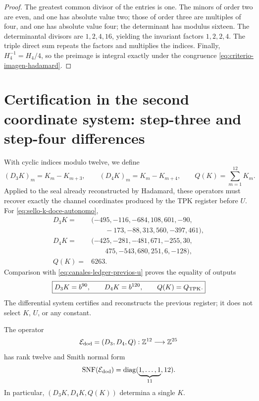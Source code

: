 \begin{proof}
The greatest common divisor of the entries is one. The minors of order two are
even, and one has absolute value two; those of order three are multiples of
four, and one has absolute value four; the determinant has modulus
sixteen. The determinantal divisors are \(1,2,4,16\), yielding
the invariant factors \(1,2,2,4\). The triple direct sum repeats the
factors and multiplies the indices. Finally,
\(H_4^{-1}=H_4/4\), so the preimage is integral exactly under the
congruence \eqref{eq:criterio-imagen-hadamard}.
\end{proof}

\section{Certification in the second coordinate system: step-three and step-four differences}

With cyclic indices modulo twelve, we define
\begin{equation}
 (D_3K)_m=K_m-K_{m+3},
 \qquad
 (D_4K)_m=K_m-K_{m+4},
 \qquad
 Q(K)=\sum_{m=1}^{12}K_m.
 \label{eq:extractor-diferencias-k}
\end{equation}
Applied to the seal already reconstructed by Hadamard, these operators must recover exactly the channel coordinates produced by the TPK register before \(U\). For \eqref{eq:sello-k-doce-autonomo},
\begin{align*}
 D_3K={}&(-495,-116,-684,108,601,-90,\\
         &\qquad-173,-88,313,560,-397,461),\\
 D_4K={}&(-425,-281,-481,671,-255,30,\\
         &\qquad475,-543,680,251,6,-128),\\
 Q(K)={}&6263.
\end{align*}
Comparison with \eqref{eq:canales-ledger-previos-u} proves the equality of outputs
\begin{equation}
 \boxed{
 D_3K=b^{90},\qquad D_4K=b^{120},\qquad Q(K)=Q_{\rm TPK}.}
 \label{eq:certificacion-canales-ledger-desde-k}
\end{equation}
The differential system certifies and reconstructs the previous register; it does not select \(K\), \(U\), or any constant.

\begin{theorem}
\label{thm:completitud-extractor-transversal-k}
The operator
\[
 \mathcal E_{\rm dod}=(D_3,D_4,Q):
 \mathbb Z^{12}\longrightarrow\mathbb Z^{25}
\]
has rank twelve and Smith normal form
\begin{equation}
 \operatorname{SNF}(\mathcal E_{\rm dod})
 =\operatorname{diag}(\underbrace{1,\ldots,1}_{11},12).
 \label{eq:snf-extractor-transversal-k}
\end{equation}
In particular, \((D_3K,D_4K,Q(K))\) determina a single \(K\).
\end{theorem}

